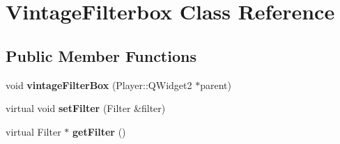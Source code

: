\hypertarget{classVintageFilterbox}{}\section{Vintage\+Filterbox Class Reference}
\label{classVintageFilterbox}
\subsection*{Public Member Functions}
\begin{DoxyCompactItemize}
\item 
\hypertarget{classVintageFilterbox_ab920eec859ec1fe44522ede8966ce90f}{}void {\bfseries vintage\+Filter\+Box} (Player\+::\+Q\+Widget2 $\ast$parent)\label{classVintageFilterbox_ab920eec859ec1fe44522ede8966ce90f}

\item 
\hypertarget{classVintageFilterbox_a09e99b0db09b8468ce7d7e0f98293ac5}{}virtual void {\bfseries set\+Filter} (Filter \&filter)\label{classVintageFilterbox_a09e99b0db09b8468ce7d7e0f98293ac5}

\item 
\hypertarget{classVintageFilterbox_ad7b14770615490d1445c958c79fd3adb}{}virtual Filter $\ast$ {\bfseries get\+Filter} ()\label{classVintageFilterbox_ad7b14770615490d1445c958c79fd3adb}

\end{DoxyCompactItemize}
